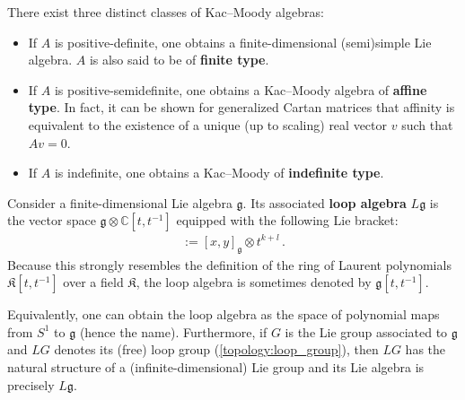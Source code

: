     \begin{remark}[Classification]
        There exist three distinct classes of Kac--Moody algebras:
        \begin{itemize}
            \item If $A$ is positive-definite, one obtains a finite-dimensional (semi)simple Lie algebra. $A$ is also said to be of \textbf{finite type}.
            \item If $A$ is positive-semidefinite, one obtains a Kac--Moody algebra of \textbf{affine type}. In fact, it can be shown for generalized Cartan matrices that affinity is equivalent to the existence of a unique (up to scaling) real vector $v$ such that $Av=0$.
            \item If $A$ is indefinite, one obtains a Kac--Moody of \textbf{indefinite type}.
        \end{itemize}
    \end{remark}

    \begin{definition}
        Consider a finite-dimensional Lie algebra $\mathfrak{g}$. Its associated \textbf{loop algebra} $L\mathfrak{g}$ is the vector space $\mathfrak{g}\otimes\mathbb{C}[t,t^{-1}]$ equipped with the following Lie bracket:
        \begin{gather}
            [x\otimes t^k,y\otimes t^l] := [x,y]_{\mathfrak{g}}\otimes t^{k+l}\,.
        \end{gather}
        Because this strongly resembles the definition of the ring of Laurent polynomials $\mathfrak{K}[t,t^{-1}]$ over a field $\mathfrak{K}$, the loop algebra is sometimes denoted by $\mathfrak{g}[t,t^{-1}]$.

        Equivalently, one can obtain the loop algebra as the space of polynomial maps from $S^1$ to $\mathfrak{g}$ (hence the name). Furthermore, if $G$ is the Lie group associated to $\mathfrak{g}$ and $LG$ denotes its (free) loop group (\cref{topology:loop_group}), then $LG$ has the natural structure of a (infinite-dimensional) Lie group and its Lie algebra is precisely $L\mathfrak{g}$.
    \end{definition}

